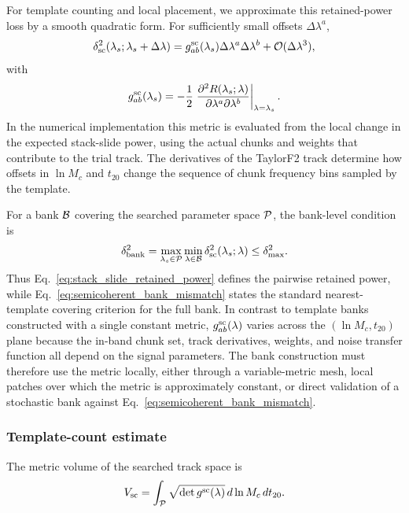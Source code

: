 \documentclass[aps,prd,amsmath,floats,floatfix, twocolumn,
superscriptaddress,nofootinbib,showpacs]{revtex4-2}
\begin{document}
For template counting and local placement, we approximate this retained-power
loss by a smooth quadratic form.  For sufficiently small offsets
$\Delta\lambda^a$,
\begin{equation}
\delta^2_{\rm sc}(\lambda_s;\lambda_s+\Delta\lambda)
=
g^{\rm sc}_{ab}(\lambda_s)\Delta\lambda^a\Delta\lambda^b
 + {\cal O}(\Delta\lambda^3),
\label{eq:semicoherent_metric_expansion}
\end{equation}
with
\begin{equation}
g^{\rm sc}_{ab}(\lambda_s)
=
-\frac{1}{2}
\left.
\frac{\partial^2 R(\lambda_s;\lambda)}
{\partial\lambda^a\partial\lambda^b}
\right|_{\lambda=\lambda_s}.
\label{eq:semicoherent_metric_tensor}
\end{equation}
In the numerical implementation this metric is evaluated from the local change
in the expected stack-slide power, using the actual chunks and weights that
contribute to the trial track.  The derivatives of the TaylorF2 track determine
how offsets in $\ln M_c$ and $t_{20}$ change the sequence of chunk frequency
bins sampled by the template.

For a bank ${\cal B}$ covering the searched parameter space ${\cal P}$, the
bank-level condition is
\begin{equation}
\delta^2_{\rm bank}
=
\max_{\lambda_s\in{\cal P}}
\min_{\lambda\in{\cal B}}
\delta^2_{\rm sc}(\lambda_s;\lambda)
\leq
\delta^2_{\max}.
\label{eq:semicoherent_bank_mismatch}
\end{equation}
Thus Eq.~\eqref{eq:stack_slide_retained_power} defines the pairwise retained
power, while Eq.~\eqref{eq:semicoherent_bank_mismatch} states the standard
nearest-template covering criterion for the full bank.  In contrast to template
banks constructed with a single constant metric, $g^{\rm sc}_{ab}(\lambda)$
varies across the $(\ln M_c,t_{20})$ plane because the in-band chunk set, track
derivatives, weights, and noise transfer function all depend on the signal
parameters.  The bank construction must therefore use the metric locally, either
through a variable-metric mesh, local patches over which the metric is
approximately constant, or direct validation of a stochastic bank against
Eq.~\eqref{eq:semicoherent_bank_mismatch}.


\subsubsection{Template-count estimate}
\label{sec:semicoherent_count_estimate}

The metric volume of the searched track space is
\begin{equation}
    V_{\rm sc}
    =
    \int_{\cal P}
    \sqrt{\det g^{\rm sc}(\lambda)}
    \,d\ln M_c\,dt_{20}.
    \label{eq:semicoherent_metric_volume}
\end{equation}
\end{document}
